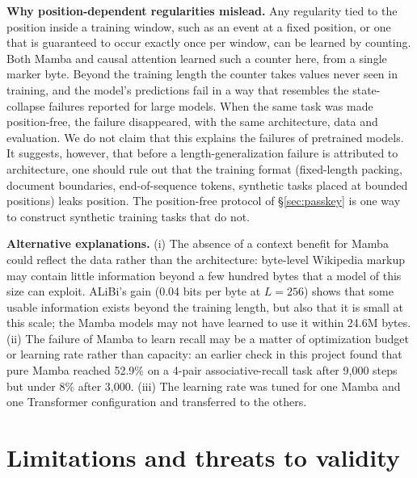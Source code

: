 \documentclass[11pt]{article}
\begin{document}
\textbf{Why position-dependent regularities mislead.} Any regularity tied to the position inside a training window, such as an event at a fixed position, or one that is guaranteed to occur exactly once per window, can be learned by counting. Both Mamba and causal attention learned such a counter here, from a single marker byte. Beyond the training length the counter takes values never seen in training, and the model's predictions fail in a way that resembles the state-collapse failures reported for large models. When the same task was made position-free, the failure disappeared, with the same architecture, data and evaluation. We do not claim that this explains the failures of pretrained models. It suggests, however, that before a length-generalization failure is attributed to architecture, one should rule out that the training format (fixed-length packing, document boundaries, end-of-sequence tokens, synthetic tasks placed at bounded positions) leaks position. The position-free protocol of \S\ref{sec:passkey} is one way to construct synthetic training tasks that do not.

\textbf{Alternative explanations.} (i) The absence of a context benefit for Mamba could reflect the data rather than the architecture: byte-level Wikipedia markup may contain little information beyond a few hundred bytes that a model of this size can exploit. ALiBi's gain (0.04 bits per byte at $L = 256$) shows that some usable information exists beyond the training length, but also that it is small at this scale; the Mamba models may not have learned to use it within 24.6M bytes. (ii) The failure of Mamba to learn recall may be a matter of optimization budget or learning rate rather than capacity: an earlier check in this project found that pure Mamba reached 52.9\% on a 4-pair associative-recall task after 9,000 steps but under 8\% after 3,000. (iii) The learning rate was tuned for one Mamba and one Transformer configuration and transferred to the others.

\section{Limitations and threats to validity}\label{sec:limits}
\end{document}
